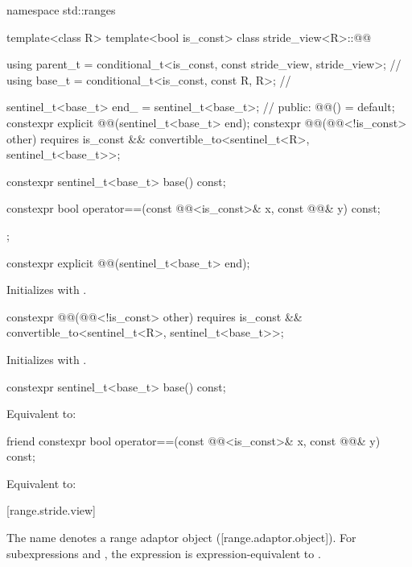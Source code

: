 \begin{codeblock}
namespace std::ranges {
  template<class R>
  template<bool is_const>
  class stride_view<R>::@@ {
    using parent_t = conditional_t<is_const, const stride_view, stride_view>; // \expos
    using base_t = conditional_t<is_const, const R, R>;                       // \expos

    sentinel_t<base_t> end_ = sentinel_t<base_t>{}; // \expos
  public:
    @@() = default;
    constexpr explicit @@(sentinel_t<base_t> end);
    constexpr @@(@@<!is_const> other)
      requires is_const && convertible_to<sentinel_t<R>, sentinel_t<base_t>>;

    constexpr sentinel_t<base_t> base() const;

    constexpr bool operator==(const @@<is_const>& x, const @@& y) const;
  };
}
\end{codeblock}

\setcounter{Paras}{0}

\begin{itemdecl}
constexpr explicit @@(sentinel_t<base_t> end);
\end{itemdecl}
\begin{itemdescr}
	\pnum
	\effects Initializes  with .
\end{itemdescr}

\begin{itemdecl}
constexpr @@(@@<!is_const> other)
  requires is_const && convertible_to<sentinel_t<R>, sentinel_t<base_t>>;
\end{itemdecl}
\begin{itemdescr}
	\pnum
	\effects Initializes  with .
\end{itemdescr}

\begin{itemdecl}
constexpr sentinel_t<base_t> base() const;
\end{itemdecl}
\begin{itemdescr}
	\pnum
	\effects Equivalent to: 
\end{itemdescr}

\begin{itemdecl}
friend constexpr bool operator==(const @@<is_const>& x, const @@& y) const;
\end{itemdecl}
\begin{itemdescr}
	\pnum
	\effects Equivalent to: 
\end{itemdescr}

[range.stride.view]{}

\setcounter{Paras}{0}
\pnum
The name  denotes a range adaptor object ([range.adaptor.object]). For
subexpressions  and , the expression  is
expression-equivalent to .
